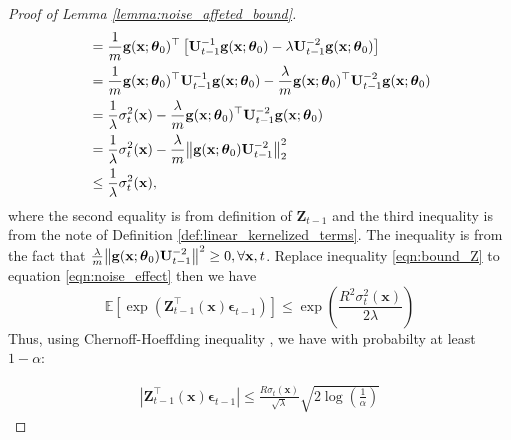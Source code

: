 \begin{proof}[Proof of Lemma \ref{lemma:noise_affeted_bound}]
\begin{equation}
\begin{split}
        & = \frac{1}{m} \mathbf{g}(\mathbf{x}; \boldsymbol{\theta}_0)^\top \left[ \mathbf{U}^{-1}_{t-1} \mathbf{g}(\mathbf{x}; \boldsymbol{\theta}_0) - \lambda \mathbf{U}^{-2}_{t-1}\mathbf{g}(\mathbf{x}; \boldsymbol{\theta}_0) \right] \\ 
        & = \frac{1}{m} \mathbf{g}(\mathbf{x}; \boldsymbol{\theta}_0)^\top \mathbf{U}^{-1}_{t-1} \mathbf{g}(\mathbf{x}; \boldsymbol{\theta}_0) - \frac{\lambda}{m} \mathbf{g}(\mathbf{x}; \boldsymbol{\theta}_0)^\top \mathbf{U}^{-2}_{t-1}\mathbf{g}(\mathbf{x}; \boldsymbol{\theta}_0)\\
        & = \frac{1}{\lambda}\sigma_t^2(\mathbf{x}) - \frac{\lambda}{m} \mathbf{g}(\mathbf{x}; \boldsymbol{\theta}_0)^\top \mathbf{U}^{-2}_{t-1}\mathbf{g}(\mathbf{x}; \boldsymbol{\theta}_0)\\ 
        & = \frac{1}{\lambda}\sigma_t^2(\mathbf{x}) - \frac{\lambda}{m} \norm{\mathbf{g}(\mathbf{x}; \boldsymbol{\theta}_0) \mathbf{U}^{-2}_{t-1}}^2_2 \\
        & \leq \frac{1}{\lambda} \sigma_t^2(\mathbf{x}),
\end{split}
\end{equation}
where the second equality is from definition of $\mathbf{Z}_{t-1}$ and the third inequality is from the note of Definition \ref{def:linear_kernelized_terms}.  The inequality is from the fact that  $\frac{\lambda}{m} \norm{\mathbf{g}(\mathbf{x}; \boldsymbol{\theta}_0) \mathbf{U}^{-2}_{t-1}}^2 \ge 0, \forall \mathbf{x},t$. Replace inequality \ref{eqn:bound_Z} to equation \ref{eqn:noise_effect} then we have 
\[ \mathbb E \left[\exp \left( \mathbf{Z}_{t-1}^\top(\mathbf{x})\boldsymbol{\epsilon}_{t-1}   \right) \right] \leq \exp (\frac{R^2\sigma_t^2(\mathbf{x})}{2\lambda}) \]
Thus, using Chernoff-Hoeffding inequality \citep{antonini2008convergence}, we have with probabilty at least $1-\alpha$: 

\begin{equation*}
    \begin{split}
        \left \lvert \mathbf{Z}_{t-1}^\top(\mathbf{x})\boldsymbol{\epsilon}_{t-1} \right \rvert \leq \frac{R\sigma_t(\mathbf{x})}{\sqrt{\lambda}} \sqrt{2 \log(\frac{1}{\alpha})}
    \end{split}
\end{equation*}
\end{proof}


